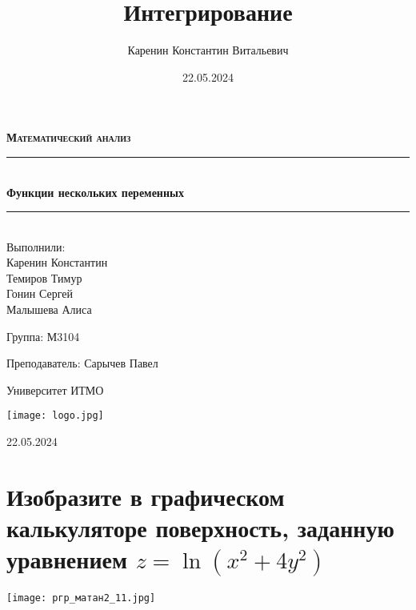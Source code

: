 \documentclass{article}
\title{Интегрирование}
\author{Каренин Константин Витальевич}
\date{22.05.2024}
\begin{document}
\begin{titlepage}
    \centering
    \vspace*{0.5 cm}
    
    \textsc{\LARGE \textbf{Математический анализ}}
    \vspace{1.5cm}
    
    \rule{\linewidth}{0.2 mm} \\[0.4 cm]
    { \huge \bfseries Функции нескольких переменных}
    \rule{\linewidth}{0.2 mm} \\[1.5 cm]
    
    \Large Выполнили: \\
    Каренин Константин \\
    Темиров Тимур \\
    Гонин Сергей \\
    Малышева Алиса \\
    
    \vspace{0.5cm}
    
    Группа: М3104
    
    \vspace{0.5cm}
    
    Преподаватель: Сарычев Павел
    
    \vspace{0.5cm}
    
    Университет ИТМО
    
    \vfill

    \texttt{[image: logo.jpg]}
    
    22.05.2024
    
\end{titlepage}

\setcounter{page}{2}

\newpage
    \section{Изобразите в графическом калькуляторе поверхность, заданную уравнением $z = \ln(x^2 + 4 y^2)$}
    \texttt{[image: ргр\_матан2\_11.jpg]}
    
\end{document}
